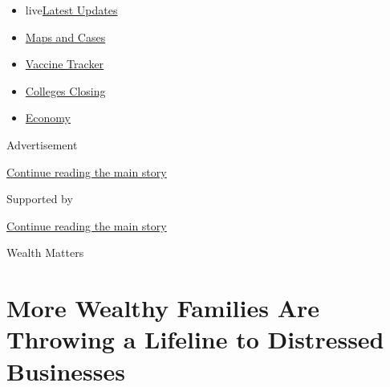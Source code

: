 \begin{itemize}
\tightlist
\item
  live\href{https://www.nytimes3xbfgragh.onion/2020/08/20/world/coronavirus-covid.html?name=styln-coronavirus-national\&region=TOP_BANNER\&variant=undefined\&block=storyline_menu_recirc\&action=click\&pgtype=Article\&impression_id=1470dab1-e384-11ea-87e8-83b655896aaa}{Latest
  Updates}
\item
  \href{https://www.nytimes3xbfgragh.onion/interactive/2020/us/coronavirus-us-cases.html?name=styln-coronavirus-national\&region=TOP_BANNER\&variant=undefined\&block=storyline_menu_recirc\&action=click\&pgtype=Article\&impression_id=1470dab2-e384-11ea-87e8-83b655896aaa}{Maps
  and Cases}
\item
  \href{https://www.nytimes3xbfgragh.onion/interactive/2020/science/coronavirus-vaccine-tracker.html?name=styln-coronavirus-national\&region=TOP_BANNER\&variant=undefined\&block=storyline_menu_recirc\&action=click\&pgtype=Article\&impression_id=1470dab3-e384-11ea-87e8-83b655896aaa}{Vaccine
  Tracker}
\item
  \href{https://www.nytimes3xbfgragh.onion/2020/08/19/us/colleges-closing-covid.html?name=styln-coronavirus-national\&region=TOP_BANNER\&variant=undefined\&block=storyline_menu_recirc\&action=click\&pgtype=Article\&impression_id=1470dab4-e384-11ea-87e8-83b655896aaa}{Colleges
  Closing}
\item
  \href{https://www.nytimes3xbfgragh.onion/live/2020/08/20/business/stock-market-today-coronavirus?name=styln-coronavirus-national\&region=TOP_BANNER\&variant=undefined\&block=storyline_menu_recirc\&action=click\&pgtype=Article\&impression_id=1470dab5-e384-11ea-87e8-83b655896aaa}{Economy}
\end{itemize}

Advertisement

\protect\hyperlink{after-top}{Continue reading the main story}

Supported by

\protect\hyperlink{after-sponsor}{Continue reading the main story}

Wealth Matters

\hypertarget{more-wealthy-families-are-throwing-a-lifeline-to-distressed-businesses}{%
\section{More Wealthy Families Are Throwing a Lifeline to Distressed
Businesses}\label{more-wealthy-families-are-throwing-a-lifeline-to-distressed-businesses}}

